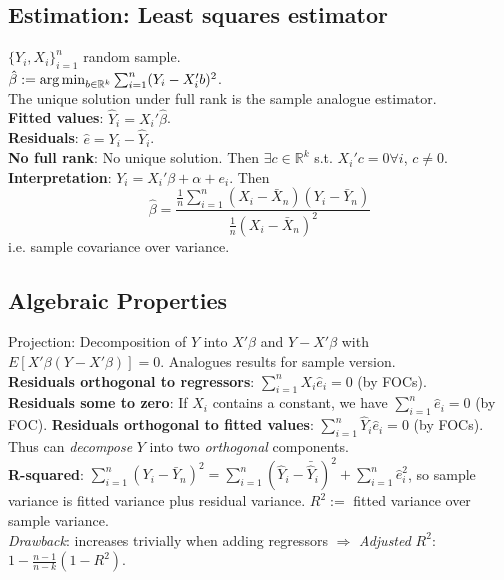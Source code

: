\subsection{Estimation: Least squares estimator}
$\{Y_i, X_i\}_{i=1}^n$ random sample. \\
$\hat{\beta} := \operatorname*{arg\,min}_{b\in\mathbb{R}^k} \sum_{i=1}^n(Y_i - X_i'b)^2$.\\
The unique solution under full rank is the sample analogue estimator.\\
\textbf{Fitted values}: $\hat{Y}_i = X_i'\hat{\beta}$.\\
\textbf{Residuals}: $\hat{e} = Y_i - \hat{Y}_i$.\\
\textbf{No full rank}: No unique solution. Then $\exists c\in\mathbb{R}^k$ s.t. $X_i'c = 0\forall i$, $c\neq0$.
\textbf{Interpretation}: $Y_i = X_i'\beta + \alpha + e_i$. Then 
$$\hat{\beta} = \frac{\frac{1}{n}\sum_{i=1}^n(X_i-\bar{X}_n)(Y_i-\bar{Y}_n)}{\frac{1}{n}(X_i-\bar{X}_n)^2}$$
i.e. sample covariance over variance.

\subsection{Algebraic Properties}
Projection: Decomposition of $Y$ into $X'\beta$ and $Y-X'\beta$ with $E[X'\beta(Y-X'\beta)] = 0$. Analogues results for sample version.\\
\textbf{Residuals orthogonal to regressors}: $\sum_{i=1}^nX_i\hat{e}_i = 0$ (by FOCs).\\
\textbf{Residuals some to zero}: If $X_i$ contains a constant, we have $\sum_{i=1}^n\hat{e}_i = 0$ (by FOC).
\textbf{Residuals orthogonal to fitted values}: $\sum_{i=1}^n \hat{Y}_i\hat{e}_i = 0$ (by FOCs). \\
Thus can \textit{decompose} $Y$ into two \textit{orthogonal} components.\\
\textbf{R-squared}: $\sum_{i=1}^n(Y_i-\bar{Y}_n)^2 = \sum_{i=1}^n(\hat{Y}_i - \bar{\hat{Y}}_i)^2 + \sum_{i=1}^n\hat{e}^2_i$, so sample variance is fitted variance plus residual variance. $R^2:=$ fitted variance over sample variance.\\
\textit{Drawback}: increases trivially when adding regressors $\Rightarrow$ \textit{Adjusted} $R^2$: $1 - \frac{n-1}{n-k}(1-R^2)$.

